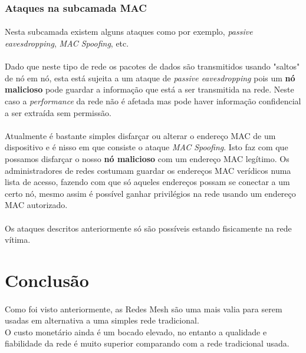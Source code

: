 \documentclass[letterpaper, 11pt]{article}
\begin{document}
\subsubsection{Ataques na subcamada MAC}
\label{sec:orgae8a110}

\paragraph{}
Nesta subcamada existem alguns ataques como por exemplo, \emph{passive eavesdropping}, \emph{MAC Spoofing}, etc.

\paragraph{}
Dado que neste tipo de rede os pacotes de dados são transmitidos usando "saltos" de nó em nó, esta está sujeita a um ataque de \emph{passive eavesdropping} pois um \textbf{nó malicioso} pode guardar
a informação que está a ser transmitida na rede. Neste caso a \emph{performance} da rede não é afetada mas pode haver informação confidencial a ser extraída sem permissão.\\

\paragraph{}
Atualmente é bastante simples disfarçar ou alterar o endereço MAC de um dispositivo e é nisso em que consiste o ataque \emph{MAC Spoofing}. Isto faz com que possamos disfarçar o nosso \textbf{nó malicioso}
com um endereço MAC legítimo. Os administradores de redes costumam guardar os endereços MAC verídicos numa lista de acesso, fazendo com que só aqueles endereços possam se conectar a um certo nó,
mesmo assim é possível ganhar privilégios na rede usando um endereço MAC autorizado.

\paragraph{}
Os ataques descritos anteriormente só são possíveis estando fisicamente na rede vítima.



\clearpage
\section{Conclusão}
\label{sec:orgf9c4cf2}

\paragraph{}
Como foi visto anteriormente, as Redes Mesh são uma mais valia para serem usadas em alternativa a uma simples rede tradicional.\\
O custo monetário ainda é um bocado elevado, no entanto a qualidade e fiabilidade da rede é muito superior comparando com a rede tradicional usada.
\end{document}
